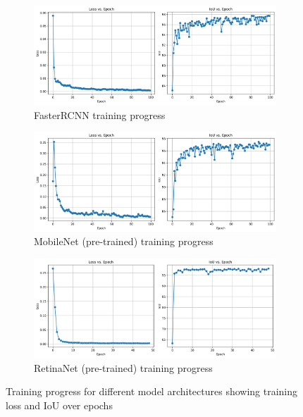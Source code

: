 \documentclass[conference]{IEEEtran}
\begin{document}
\begin{figure}[h]
    \centering
    \begin{subfigure}[b]{0.45\textwidth}
      \centering
      \includegraphics[width=\textwidth]{images/File5_FasterRCNN_training_progress.png}
      \caption{FasterRCNN training progress}
      \label{fig:progress_fasterrcnn}
    \end{subfigure}
    \hfill
    \begin{subfigure}[b]{0.45\textwidth}
      \centering
      \includegraphics[width=\textwidth]{images/File5_MobileNet_training_progress copy.png}
      \caption{MobileNet (pre-trained) training progress}
      \label{fig:progress_mobilenet}
    \end{subfigure}    
    \vspace{0.5cm}
    \begin{subfigure}[b]{0.45\textwidth}
      \centering
      \includegraphics[width=\textwidth]{images/File5_RetinaNet_training_progress.png}
      \caption{RetinaNet (pre-trained) training progress}
      \label{fig:progress_retinanet}
    \end{subfigure}
    \caption{Training progress for different model architectures showing training loss and IoU over epochs}
    \label{fig:training_progress_detection}
\end{figure}
\end{document}

